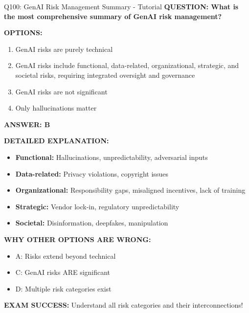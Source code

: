 \documentclass[8pt]{beamer}
\begin{document}
	\begin{frame}{Q100: GenAI Risk Management Summary - Tutorial}
		\fontsize{6.5}{7.5}\selectfont
		\textbf{QUESTION: What is the most comprehensive summary of GenAI risk management?}
		
		\vspace{0.1cm}
		\textbf{OPTIONS:}
		\begin{enumerate}
			\item GenAI risks are purely technical
			\item GenAI risks include functional, data-related, organizational, strategic, and societal risks, requiring integrated oversight and governance
			\item GenAI risks are not significant
			\item Only hallucinations matter
		\end{enumerate}
		
		\vspace{0.1cm}
		\textcolor{myblue}{\textbf{ANSWER: B}}
		
		\vspace{0.1cm}
		\textbf{DETAILED EXPLANATION:}
		\begin{itemize}
			\item \textbf{Functional:} Hallucinations, unpredictability, adversarial inputs
			\item \textbf{Data-related:} Privacy violations, copyright issues
			\item \textbf{Organizational:} Responsibility gaps, misaligned incentives, lack of training
			\item \textbf{Strategic:} Vendor lock-in, regulatory unpredictability
			\item \textbf{Societal:} Disinformation, deepfakes, manipulation
		\end{itemize}
		
		\vspace{0.1cm}
		\textcolor{myred}{\textbf{WHY OTHER OPTIONS ARE WRONG:}}
		\begin{itemize}
			\item \textcolor{myred}{A:} Risks extend beyond technical
			\item \textcolor{myred}{C:} GenAI risks ARE significant
			\item \textcolor{myred}{D:} Multiple risk categories exist
		\end{itemize}
		
		\textcolor{myred}{\textbf{EXAM SUCCESS:}} Understand \textcolor{myblue}{all risk categories} and their interconnections!
	\end{frame}
	
\end{document}
